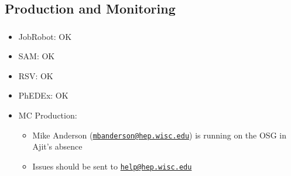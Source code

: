 \documentclass{beamer}
\newcommand{\email}[1]{{\texttt #1}}
\renewcommand{\email}[1]{\href{mailto:#1}{\nolinkurl{#1}}}
\begin{document}
\subsection{Production and Monitoring}
\begin{frame}
\frametitle{}
\begin{itemize}
     \item JobRobot: OK
     \item SAM: OK
     \item RSV: OK
     \item PhEDEx: OK
     \item MC Production:
     \begin{itemize}
        \item Mike Anderson (\email{mbanderson@hep.wisc.edu}) is running on the OSG in Ajit's absence
        \item Issues should be sent to \email{help@hep.wisc.edu}
     \end{itemize}
\end{itemize}
\end{frame}
\end{document}
